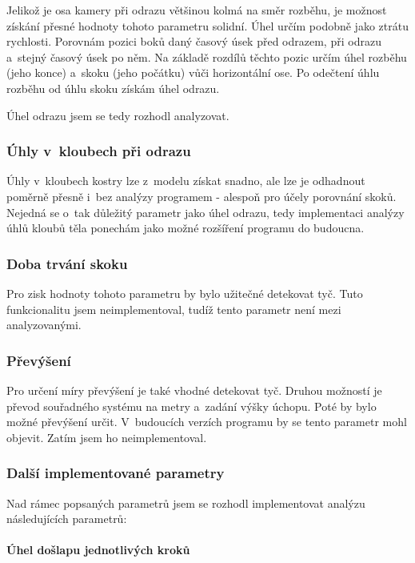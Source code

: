 Jelikož je osa kamery při odrazu většinou kolmá na směr rozběhu, je možnost získání přesné hodnoty tohoto parametru solidní. Úhel určím podobně jako ztrátu rychlosti. Porovnám pozici boků daný časový úsek před odrazem, při odrazu a~stejný časový úsek po něm. Na základě rozdílů těchto pozic určím úhel rozběhu (jeho konce) a~skoku (jeho počátku) vůči horizontální ose. Po odečtení úhlu rozběhu od úhlu skoku získám úhel odrazu.

Úhel odrazu jsem se tedy rozhodl analyzovat.


\subsubsection{Úhly v~kloubech při odrazu}

Úhly v~kloubech kostry lze z~modelu získat snadno, ale lze je odhadnout poměrně přesně i~bez analýzy programem - alespoň pro účely porovnání skoků. Nejedná se o~tak důležitý parametr jako úhel odrazu, tedy implementaci analýzy úhlů kloubů těla ponechám jako možné rozšíření programu do budoucna.


\subsubsection{Doba trvání skoku}

Pro zisk hodnoty tohoto parametru by bylo užitečné detekovat tyč. Tuto funkcionalitu jsem neimplementoval, tudíž tento parametr není mezi analyzovanými.


\subsubsection{Převýšení}

Pro určení míry převýšení je také vhodné detekovat tyč. Druhou možností je převod souřadného systému na metry a~zadání výšky úchopu. Poté by bylo možné převýšení určit. V~budoucích verzích programu by se tento parametr mohl objevit. Zatím jsem ho neimplementoval.


\subsubsection{Další implementované parametry}

Nad rámec popsaných parametrů jsem se rozhodl implementovat analýzu následujících parametrů:

\paragraph{Úhel došlapu jednotlivých kroků}

